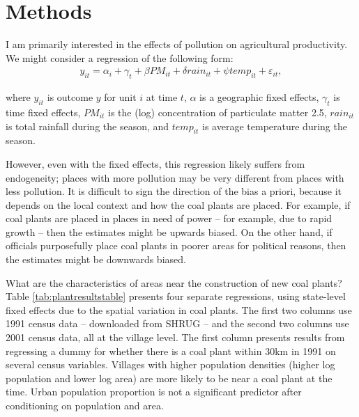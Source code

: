 \documentclass[
]{article}
\begin{document}
\hypertarget{methods}{%
\section{Methods}\label{methods}}

\label{identification}

I am primarily interested in the effects of pollution on agricultural productivity. We might consider a regression of the following form:
\begin{gather} y_{it} = \alpha_{i} + \gamma_{t} + \beta PM_{it} + \delta rain_{it} + \psi temp_{it} + \varepsilon_{it}, \end{gather}

where \(y_{it}\) is outcome \(y\) for unit \(i\) at time \(t\), \(\alpha\) is a geographic fixed effects, \(\gamma_t\) is time fixed effects, \(PM_{it}\) is the (log) concentration of particulate matter 2.5, \(rain_{it}\) is total rainfall during the season, and \(temp_{it}\) is average temperature during the season.

However, even with the fixed effects, this regression likely suffers from endogeneity; places with more pollution may be very different from places with less pollution. It is difficult to sign the direction of the bias a priori, because it depends on the local context and how the coal plants are placed. For example, if coal plants are placed in places in need of power -- for example, due to rapid growth -- then the estimates might be upwards biased. On the other hand, if officials purposefully place coal plants in poorer areas for political reasons, then the estimates might be downwards biased.

What are the characteristics of areas near the construction of new coal plants? Table \ref{tab:plantresultstable} presents four separate regressions, using state-level fixed effects due to the spatial variation in coal plants. The first two columns use 1991 census data -- downloaded from SHRUG -- and the second two columns use 2001 census data, all at the village level. The first column presents results from regressing a dummy for whether there is a coal plant within 30km in 1991 on several census variables. Villages with higher population densities (higher log population and lower log area) are more likely to be near a coal plant at the time. Urban population proportion is not a significant predictor after conditioning on population and area.
\end{document}
